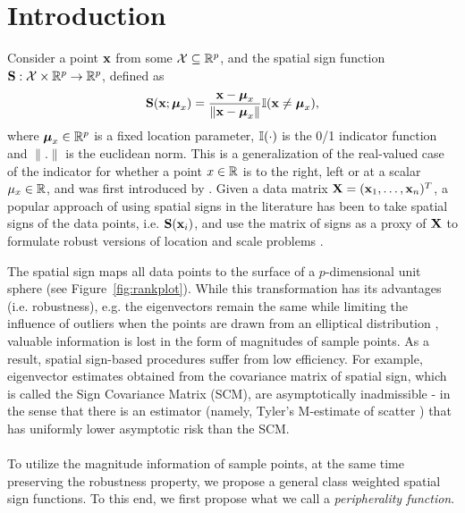 \section{Introduction}
\label{Section:SP}
 
Consider a point ${\bf{x}}$ from some $\mathcal{X} \subseteq {\mathbb{R}}^p$, and the spatial sign function ${\mathbf{S}} : \mathcal{X} \times {\mathbb{R}}^p \rightarrow {\mathbb{R}}^p$, defined as
%
$$
{\mathbf{S}} ({\bf{x}}; {\boldsymbol{\mu}}_x) = \frac{{\bf{x}} - {\boldsymbol{\mu}}_x}{\| {\bf{x}} - {\boldsymbol{\mu}}_x \|}
{\mathbb{I}} ( {\bf{x}} \ne {\boldsymbol{\mu}}_x ),
$$
%
where ${\boldsymbol{\mu}}_x \in {\mathbb{R}}^p$ is a fixed location parameter, ${\mathbb{I}}(\cdot)$ is the 0/1 indicator function and $\|.\|$ is the euclidean norm. This is a generalization of the real-valued case of the indicator for whether a point $x \in {\mathbb{R}}$ is to the right, left or at a scalar $\mu_{x} \in {\mathbb{R}}$, and was first introduced by \cite{MottonenOja95}. Given a data matrix ${\mathbf{X}} = ({\bf{x}}_{1}, \ldots, {\bf{x}}_{n})^T$, a popular approach of using spatial signs in the literature has been to take spatial signs of the data points, i.e. ${\mathbf{S}}({\bf{x}}_i)$, and use the matrix of signs as a proxy of ${\mathbf{X}}$ to formulate robust versions of location and scale problems  \citep{locantore99, OjaBook10,WangPengLi15}.

The spatial sign maps all data points to the surface of a $p$-dimensional unit sphere (see Figure~\ref{fig:rankplot}). While this transformation has its advantages (i.e. robustness), e.g. the eigenvectors remain the same while limiting the influence of outliers when the points are drawn from an elliptical distribution \citep{taskinen12}, valuable information is lost in the form of magnitudes of sample points. As a result, spatial sign-based procedures suffer from low efficiency. For example, eigenvector estimates obtained from the covariance matrix of spatial sign, which is called the Sign Covariance Matrix (SCM), are asymptotically inadmissible \citep{magyar14}- in the sense that there is an estimator (namely, Tyler's M-estimate of scatter \citep{tyler87}) that has uniformly lower asymptotic risk than the SCM.

\paragraph{}
To utilize the magnitude information of sample points, at the same time preserving the robustness property, we propose a general class weighted spatial sign functions. To this end, we first propose what we call a {\it peripherality function}.

